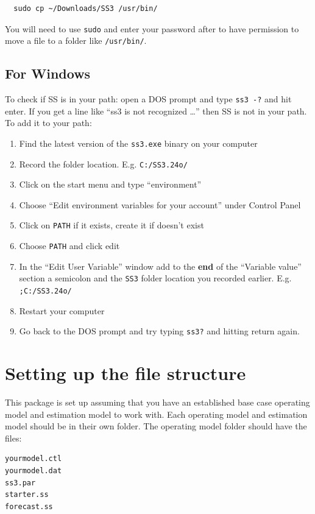 \documentclass[12pt]{article}
\begin{document}
\begin{verbatim}
  sudo cp ~/Downloads/SS3 /usr/bin/
\end{verbatim}

\noindent
You will need to use \texttt{sudo} and enter your password after to have 
permission to move a file to a folder like \texttt{/usr/bin/}.

\subsection{For Windows}
To check if SS is in your path: open a DOS prompt and type \texttt{ss3 -?} and 
hit enter. If you get a line like ``ss3 is not recognized \ldots'' then SS is 
not in your path. To add it to your path:

\begin{enumerate}
  \item Find the latest version of the \texttt{ss3.exe} binary on your computer
  \item Record the folder location. E.g. \texttt{C:/SS3.24o/}
  \item Click on the start menu and type ``environment''
  \item Choose ``Edit environment variables for your account'' under Control 
    Panel
  \item Click on \texttt{PATH} if it exists, create it if doesn't exist
  \item Choose \texttt{PATH} and click edit
  \item In the ``Edit User Variable'' window add to the \textbf{end} of the 
    ``Variable value'' section a semicolon and the \texttt{SS3} folder location you 
    recorded earlier. E.g. \texttt{;C:/SS3.24o/}
  \item Restart your computer
  \item Go back to the DOS prompt and try typing \texttt{ss3?} and hitting 
    return again.
\end{enumerate}


\section{Setting up the file structure}
This package is set up assuming that you have an established base case 
operating model and estimation model to work with. Each operating model and 
estimation model should be in their own folder. The operating model folder 
should have the files:

\begin{verbatim}
yourmodel.ctl
yourmodel.dat
ss3.par
starter.ss
forecast.ss
\end{verbatim}
\end{document}
